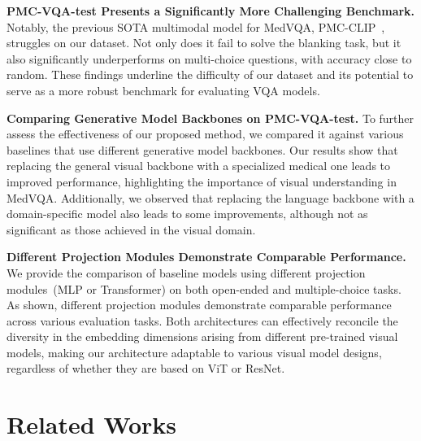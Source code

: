 \documentclass{article}
\begin{document}
\noindent \textbf{PMC-VQA-test Presents a Significantly More Challenging Benchmark.}
Notably, the previous SOTA multimodal model for MedVQA, 
PMC-CLIP~\cite{lin2023pmcclip}, struggles on our dataset. 
Not only does it fail to solve the blanking task, but it also significantly underperforms on multi-choice questions, with accuracy close to random. 
These findings underline the difficulty of our dataset and its potential to serve as a more robust benchmark for evaluating VQA models. 

\noindent \textbf{Comparing Generative Model Backbones on PMC-VQA-test.}
To further assess the effectiveness of our proposed method, we compared it against various baselines that use different generative model backbones. 
Our results show that replacing the general visual backbone with a specialized medical one leads to improved performance, highlighting the importance of visual understanding in MedVQA. Additionally, we observed that replacing the language backbone with a domain-specific model also leads to some improvements, although not as significant as those achieved in the visual domain. 

\noindent \textbf{Different Projection Modules Demonstrate Comparable Performance.}
We provide the comparison of baseline models using different projection modules~(MLP or Transformer) on both open-ended and multiple-choice tasks.
As shown, different projection modules demonstrate comparable performance across various evaluation tasks.
Both architectures can effectively reconcile the diversity in the embedding dimensions arising from different pre-trained visual models, making our architecture adaptable to various visual model designs, regardless of whether they are based on ViT or ResNet.






















 
\section{Related Works}
\end{document}

